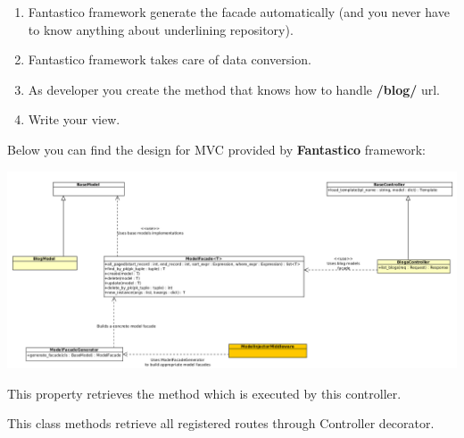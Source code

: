 \documentclass[letterpaper,10pt,english]{sphinxmanual}
\begin{document}
\begin{fulllineitems}
\begin{enumerate}
\item {} 
Fantastico framework generate the facade automatically (and you never have to know anything about underlining repository).

\item {} 
Fantastico framework takes care of data conversion.

\item {} 
As developer you create the method that knows how to handle \textbf{/blog/} url.

\item {} 
Write your view.

\end{enumerate}

Below you can find the design for MVC provided by \textbf{Fantastico} framework:

\includegraphics{mvc.png}

\begin{fulllineitems}
\label{features/mvc:fantastico.mvc.controller_decorators.Controller.fn_handler}
This property retrieves the method which is executed by this controller.

\end{fulllineitems}


\begin{fulllineitems}
\label{features/mvc:fantastico.mvc.controller_decorators.Controller.get_registered_routes}
This class methods retrieve all registered routes through Controller decorator.

\end{fulllineitems}



\end{fulllineitems}
\end{document}
